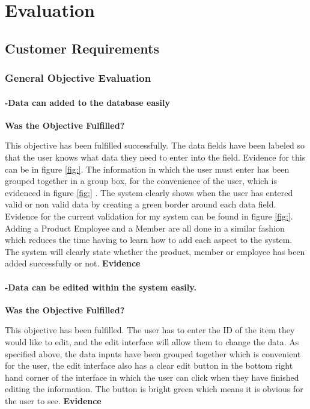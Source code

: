 \chapter{Evaluation}

\section{Customer Requirements}

\subsection{General Objective Evaluation}

\subsubsection{-Data can added to the database easily}
\textbf{Was the Objective Fulfilled?} \newline

This objective has been fulfilled successfully. The data fields have been labeled so that the user knows what data they need to enter into the field. Evidence for this can be in figure \ref{fig:}. The information in which the user must enter has been grouped together in a group box, for the convenience of the user, which is evidenced in figure \ref{fig:} . The system clearly shows when the user has entered valid or non valid data by creating a green border around each data field. Evidence for the current validation for my system can be found in figure \ref{fig:}. Adding a Product Employee and a Member are all done in a similar fashion which reduces the time having to learn how to add each aspect to the system. The system will clearly state whether the product, member or employee has been added successfully or not.
\textbf{Evidence} \newline


\subsubsection{-Data can be edited within the system easily.}
\textbf{Was the Objective Fulfilled?} \newline

This objective has been fulfilled. The user has to enter the ID of the item they would like to edit, and the edit interface will allow them to change the data. As specified above, the data inputs have been grouped together which is convenient for the user, the edit interface also has a clear edit button in the bottom right hand corner of the interface in which the user can click when they have finished editing the information. The button is bright green which means it is obvious for the user to see.
\textbf{Evidence} \newline

